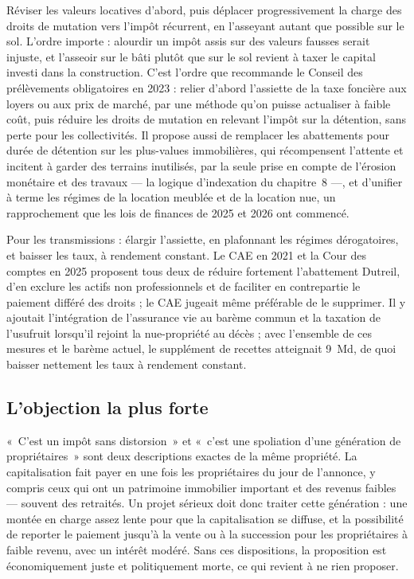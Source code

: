 \documentclass[11pt,a4paper]{article}
\providecommand{\euro}{\texteuro}
\begin{document}
Réviser les valeurs locatives d'abord, puis déplacer progressivement la charge des droits de
mutation vers l'impôt récurrent, en l'asseyant autant que possible sur le sol. L'ordre importe :
alourdir un impôt assis sur des valeurs fausses serait injuste, et l'asseoir sur le bâti plutôt que
sur le sol revient à taxer le capital investi dans la construction. C'est l'ordre que recommande le
Conseil des prélèvements obligatoires en 2023 : relier d'abord l'assiette de la taxe foncière aux
loyers ou aux prix de marché, par une méthode qu'on puisse actualiser à faible coût, puis réduire
les droits de mutation en relevant l'impôt sur la détention, sans perte pour les collectivités. Il
propose aussi de remplacer les abattements pour durée de détention sur les plus-values
immobilières, qui récompensent l'attente et incitent à garder des terrains inutilisés, par la
seule prise en compte de l'érosion monétaire et des travaux --- la logique d'indexation du
chapitre~8 ---, et d'unifier à terme les régimes de la location meublée et de la location nue, un
rapprochement que les lois de finances de 2025 et 2026 ont commencé.

Pour les transmissions : élargir l'assiette, en plafonnant les régimes dérogatoires, et baisser
les taux, à rendement constant. Le CAE en 2021 et la Cour des comptes en 2025 proposent tous deux de
réduire fortement l'abattement Dutreil, d'en exclure les actifs non professionnels et de faciliter
en contrepartie le paiement différé des droits ; le CAE jugeait même préférable de le supprimer. Il y
ajoutait l'intégration de l'assurance vie au barème commun et la taxation de l'usufruit lorsqu'il
rejoint la nue-propriété au décès ; avec l'ensemble de ces mesures et le barème actuel, le
supplément de recettes atteignait 9~Md\euro{}, de quoi baisser nettement les taux à rendement
constant.

\subsection{L'objection la plus forte}

«~C'est un impôt sans distorsion~» et «~c'est une spoliation d'une génération de propriétaires~»
sont deux descriptions exactes de la même propriété. La capitalisation fait payer en une fois les
propriétaires du jour de l'annonce, y compris ceux qui ont un patrimoine immobilier important et
des revenus faibles --- souvent des retraités. Un projet sérieux doit donc traiter cette
génération : une montée en charge assez lente pour que la capitalisation se diffuse, et la
possibilité de reporter le paiement jusqu'à la vente ou à la succession pour les propriétaires à
faible revenu, avec un intérêt modéré. Sans ces dispositions, la proposition est économiquement
juste et politiquement morte, ce qui revient à ne rien proposer.
\end{document}
